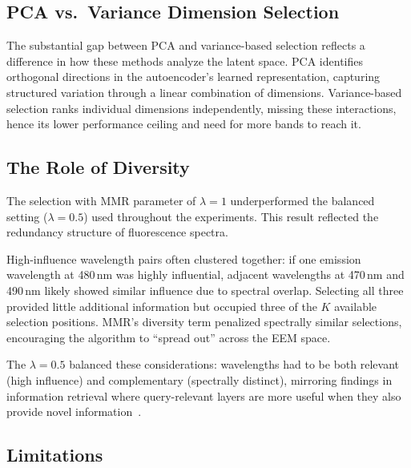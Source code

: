 \subsection{PCA vs.\ Variance Dimension Selection}
\label{sec:discussion_pca}

The substantial gap between PCA and variance-based selection reflects a difference in how these methods analyze the latent space.
PCA identifies orthogonal directions in the autoencoder's learned representation, capturing structured variation through a linear combination of dimensions.
Variance-based selection ranks individual dimensions independently, missing these interactions, hence its lower performance ceiling and need for more bands to reach it.

\subsection{The Role of Diversity}
\label{sec:discussion_diversity}

The selection with MMR parameter of $\lambda = 1$ underperformed the balanced setting ($\lambda = 0.5$) used throughout the experiments.
This result reflected the redundancy structure of fluorescence spectra.

High-influence wavelength pairs often clustered together: if one emission wavelength at 480\,nm was highly influential, adjacent wavelengths at 470\,nm and 490\,nm likely showed similar influence due to spectral overlap.
Selecting all three provided little additional information but occupied three of the $K$ available selection positions.
MMR's diversity term penalized spectrally similar selections, encouraging the algorithm to ``spread out'' across the EEM space.

The $\lambda = 0.5$ balanced these considerations: wavelengths had to be both relevant (high influence) and complementary (spectrally distinct), mirroring findings in information retrieval where query-relevant layers are more useful when they also provide novel information~\cite{carbonell1998use}.

\subsection{Limitations}
\label{sec:discussion_limitations}

